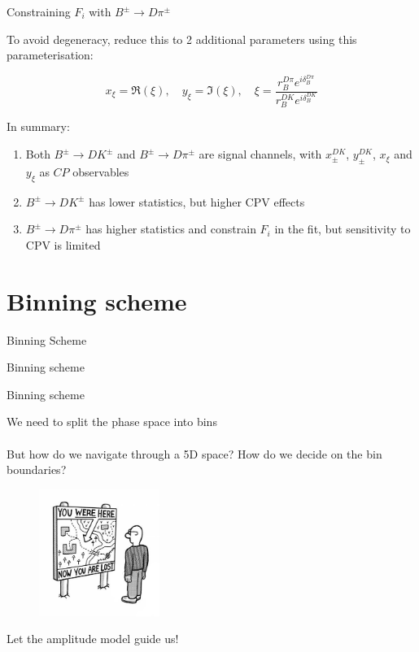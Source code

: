 \documentclass{beamer}
\begin{document}
\begin{frame}{Constraining $F_i$ with $B^\pm\to D\pi^\pm$}
  \begin{center}
    To avoid degeneracy, reduce this to 2 additional parameters using this parameterisation:
  \end{center}
  \begin{equation*}
    x_\xi = \Re(\xi),\quad y_\xi = \Im(\xi),\quad \xi = \frac{r_B^{D\pi}e^{i\delta_B^{D\pi}}}{r_B^{DK}e^{i\delta_B^{DK}}}
  \end{equation*}
  \begin{center}
    In summary:
  \end{center}
  \begin{enumerate}
    \setlength\itemsep{1.0em}
    \item{Both $B^\pm\to DK^\pm$ and $B^\pm\to D\pi^\pm$ are signal channels, with $x_\pm^{DK}$, $y_\pm^{DK}$, $x_\xi$ and $y_\xi$ as $C\!P$ observables}
    \item{$B^\pm\to DK^\pm$ has lower statistics, but higher CPV effects}
    \item{$B^\pm\to D\pi^\pm$ has higher statistics and constrain $F_i$ in the fit, but sensitivity to CPV is limited}
  \end{enumerate}
\end{frame}

\section{Binning scheme}
\begin{frame}{Binning Scheme}
  \begin{center}
    {\huge Binning scheme}
  \end{center}
\end{frame}

\begin{frame}{Binning scheme}
  \begin{center}
    \Large We need to split the phase space into bins\\~\\
    \large But how do we navigate through a 5D space? How do we decide on the bin boundaries?
  \end{center}
  \vspace{-0.5cm}
  \begin{figure}
    \centering
    \includegraphics[width = 0.35\textwidth]{Plots/TravelLost.jpeg}
  \end{figure}
  \vspace{-0.7cm}
  \begin{center}
    \Large Let the amplitude model guide us!
  \end{center}
\end{frame}
\end{document}
